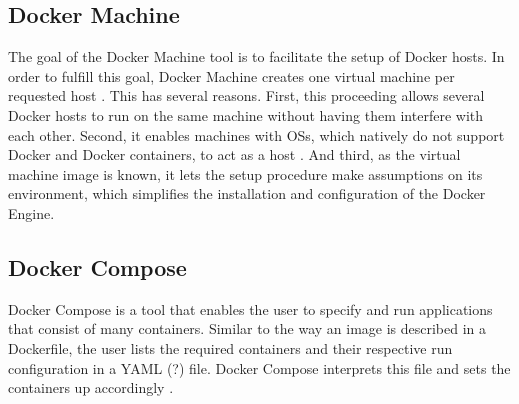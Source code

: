 
  \subsection{Docker Machine} %
  \label{sub:docker_machine}
    The goal of the Docker Machine tool is to facilitate the setup of Docker hosts. In order to fulfill this goal, Docker Machine creates one virtual machine per requested host \cite{Docker????Dockerb,Docker????Dockera}. This has several reasons. First, this proceeding allows several Docker hosts to run on the same machine without having them interfere with each other. Second, it enables machines with \ac{OS}s, which natively do not support Docker and Docker containers, to act as a host \cite{Docker????Dockera}. And third, as the virtual machine image is known, it lets the setup procedure make assumptions on its environment, which simplifies the installation and configuration of the Docker Engine.

  \subsection{Docker Compose} %
  \label{sub:docker_compose}
    Docker Compose is a tool that enables the user to specify and run applications that consist of many containers. Similar to the way an image is described in a Dockerfile, the user lists the required containers and their respective run configuration in a YAML (?) file. Docker Compose interprets this file and sets the containers up accordingly \cite{Docker????Dockerb}.


